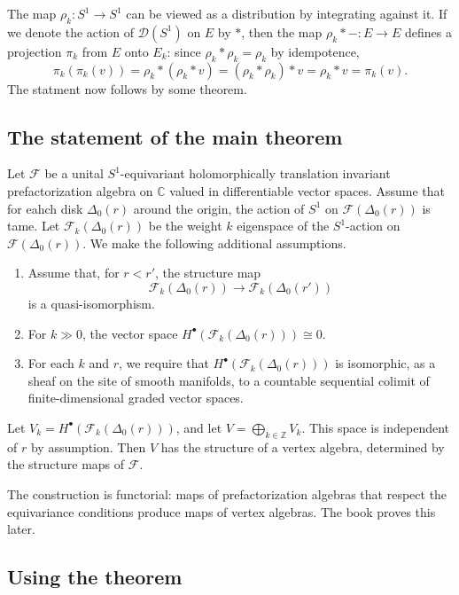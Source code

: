 The map $\rho _k : S^1 \to S^1$ can be viewed as a distribution by integrating against it. If we denote the action of $\mathcal{D} (S^1)$ on $E$ by $*$, then the map $\rho _k * - : E \to E$ defines a projection $\pi _k$ from $E$ onto $E_k$: since $\rho _k * \rho _k = \rho _k$ by idempotence,
\[
	\pi _k(\pi _k(v)) = \rho _k * (\rho _k * v) = (\rho _k * \rho _k) * v = \rho _k * v = \pi _k(v)
.\]
The statment now follows by some theorem.

\subsection{The statement of the main theorem}

\begin{theorem}\label{thm:5-2-4}
	Let $\mathcal{F} $ be a unital $S^1$-equivariant holomorphically translation invariant prefactorization algebra on $\mathbb{C} $ valued in differentiable vector spaces. Assume that for eahch disk $\Delta _0(r)$ around the origin, the action of $S^1$ on $\mathcal{F} (\Delta _0(r))$ is tame. Let $\mathcal{F} _k(\Delta _0(r))$ be the weight $k$ eigenspace of the $S^1$-action on $\mathcal{F} (\Delta _0(r))$. We make the following additional assumptions.
	\begin{enumerate}
		\item Assume that, for $r < r'$, the structure map
			\[
				\mathcal{F} _k(\Delta _0(r)) \to \mathcal{F} _k(\Delta _0(r'))
			\]
			is a quasi-isomorphism.
		\item For $k \gg 0$, the vector space $H^{\bullet} (\mathcal{F} _k(\Delta _0(r))) \cong 0$.
		\item For each $k$ and $r$, we require that $H^{\bullet} (\mathcal{F} _k(\Delta _0(r)))$ is isomorphic, as a sheaf on the site of smooth manifolds, to a countable sequential colimit of finite-dimensional graded vector spaces.
	\end{enumerate}
	Let $V_k = H^{\bullet} (\mathcal{F} _k(\Delta _0(r)))$, and let $V = \bigoplus_{k\in\mathbb{Z} } V_k$. This space is independent of $r$ by assumption. Then $V$ has the structure of a vertex algebra, determined by the structure maps of $\mathcal{F} $.
\end{theorem}

The construction is functorial: maps of prefactorization algebras that respect the equivariance conditions produce maps of vertex algebras. The book proves this later.

\subsection{Using the theorem}


